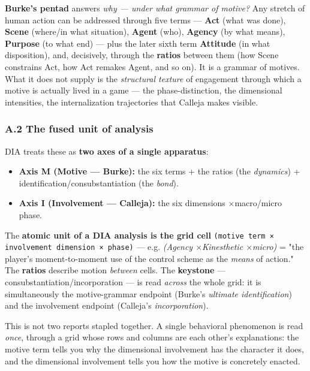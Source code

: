 \documentclass[11pt]{report}
\begin{document}
\textbf{Burke's pentad} answers \textit{why — under what grammar of motive?} Any stretch of human action can be addressed through five terms — \textbf{Act} (what was done), \textbf{Scene} (where/in what situation), \textbf{Agent} (who), \textbf{Agency} (by what means), \textbf{Purpose} (to what end) — plus the later sixth term \textbf{Attitude} (in what disposition), and, decisively, through the \textbf{ratios} between them (how Scene constrains Act, how Act remakes Agent, and so on). It is a grammar of motives. What it does not supply is the \textit{structural texture} of engagement through which a motive is actually lived in a game — the phase-distinction, the dimensional intensities, the internalization trajectories that Calleja makes visible.


\subsubsection{A.2 The fused unit of analysis}


DIA treats these as \textbf{two axes of a single apparatus}:


\begin{itemize}
\item \textbf{Axis M (Motive — Burke):} the six terms + the ratios (the \textit{dynamics}) + identification/consubstantiation (the \textit{bond}).
\item \textbf{Axis I (Involvement — Calleja):} the six dimensions $\times$\allowbreak  macro/micro phase.
\end{itemize}


The \textbf{atomic unit of a DIA analysis is the grid cell} \texttt{(motive term × involvement dimension × phase)} — e.g. \textit{(Agency $\times$\allowbreak  Kinesthetic $\times$\allowbreak  micro)} = "the player's moment-to-moment use of the control scheme as the \textit{means} of action." The \textbf{ratios} describe motion \textit{between} cells. The \textbf{keystone} — consubstantiation/incorporation — is read \textit{across} the whole grid: it is simultaneously the motive-grammar endpoint (Burke's \textit{ultimate identification}) and the involvement endpoint (Calleja's \textit{incorporation}).


This is not two reports stapled together. A single behavioral phenomenon is read \textit{once}, through a grid whose rows and columns are each other's explanations: the motive term tells you why the dimensional involvement has the character it does, and the dimensional involvement tells you how the motive is concretely enacted.
\end{document}

